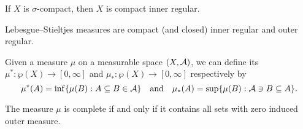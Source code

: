 If $X$ is $\sigma$-compact, then $X$ is compact inner regular.

\begin{thm}
    Lebesgue--Stieltjes measures are compact (and closed) inner regular and outer regular.
\end{thm}

Given a measure $\mu$ on a measurable space $(X,\mathcal{A})$, we can define its  $\mu^*\colon \wp(X) \to [0,\infty]$ and  $\mu_*\colon \wp(X) \to [0,\infty]$ respectively by \[
    \mu^*(A) = \inf\{\mu(B) : A \subseteq B \in \mathcal{A}\} \quad\text{and}\quad \mu_*(A) = \sup\{\mu(B) : \mathcal{A} \ni B \subseteq A\}.
\]

\begin{fact}
    The measure $\mu$ is complete if and only if it contains all sets with zero induced outer measure.
\end{fact}